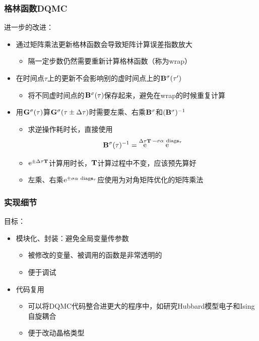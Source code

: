 \documentclass[UTF8]{ctexbeamer}
\DeclareMathOperator{\ee}{e}
\begin{document}
\begin{frame}
\frametitle{格林函数DQMC}

进一步的改进：
\begin{itemize}
    \item 通过矩阵乘法更新格林函数会导致矩阵计算误差指数放大
    \begin{itemize}
        \item 隔一定步数仍然需要重新计算格林函数（称为wrap）
    \end{itemize}
    \item 在时间点$\tau$上的更新不会影响别的虚时间点上的$\vb{B}^\sigma(\tau')$
    \begin{itemize}
        \item 将不同虚时间点的$\vb{B}^\sigma(\tau)$保存起来，避免在wrap的时候重复计算
    \end{itemize}
    \item 用$\vb{G}^\sigma(\tau)$算$\vb{G}^\sigma(\tau \pm \Delta \tau)$时需要左乘、右乘$\vb{B}^\sigma$和$(\vb{B}^\sigma)^{-1}$
    \begin{itemize}
        \item 求逆操作耗时长，直接使用
        \begin{equation}
            \vb{B}^\sigma(\tau)^{-1} = \ee^{\Delta \tau \vb{T}} \ee^{-\sigma \alpha \ \mathrm{diag}{\vb{s}_\tau}}
        \end{equation}
        \item $\ee^{\pm \Delta \tau \vb{T}}$计算用时长，$\vb{T}$计算过程中不变，应该预先算好
        \item 左乘、右乘$\ee^{\pm \sigma \alpha\ \mathrm{diag} \vb{s}_\tau}$应使用为对角矩阵优化的矩阵乘法
    \end{itemize}
\end{itemize}

\end{frame}

\begin{frame}
\frametitle{实现细节}

目标：
\begin{itemize}
    \item 模块化、封装：避免全局变量传参数
    \begin{itemize}
        \item 被修改的变量、被调用的函数是非常透明的
        \item 便于调试
    \end{itemize}
    \item 代码复用
    \begin{itemize}
        \item 可以将DQMC代码整合进更大的程序中，如研究Hubbard模型电子和Ising自旋耦合
        \item 便于改动晶格类型
    \end{itemize}
\end{itemize}    

\end{frame}
\end{document}
